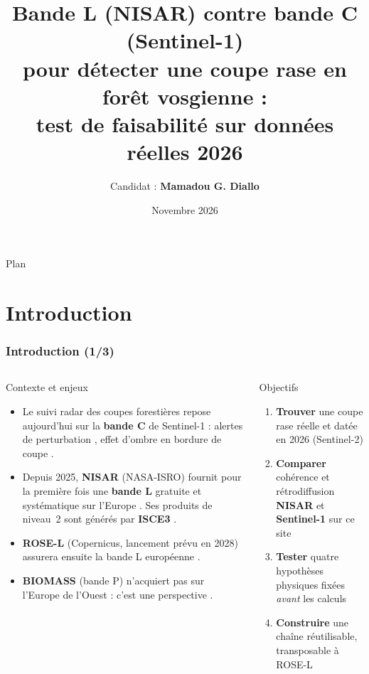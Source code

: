\documentclass[aspectratio=169]{beamer}
\title{\Large
	Bande L (NISAR) contre bande C (Sentinel-1)\\
	pour détecter une coupe rase en forêt vosgienne :\\[4pt]
	{\normalsize test de faisabilité sur données réelles 2026}
}
\author{%
	Candidat : \textbf{Mamadou G. Diallo}
}
\date{Novembre 2026}
\newcommand{\Lb}[1]{\textcolor{Lband}{\textbf{#1}}}
\newcommand{\Cb}[1]{\textcolor{Cband}{\textbf{#1}}}
\begin{document}
\begin{frame}
	\titlepage
\end{frame}

\begin{frame}{Plan}
	\tableofcontents
\end{frame}

\section{Introduction}

\begin{frame}{\phantom{x}}
	\frametitle{Introduction (1/3)}
	\small
	\begin{columns}[T]
		\begin{block}{Contexte et enjeux}
			\footnotesize
			\begin{itemize}
				\setlength{\itemsep}{3pt}
				\item Le suivi radar des coupes forestières repose aujourd'hui sur la \Cb{bande C} de
				Sentinel-1 : alertes de perturbation \parencite{reiche2021radd}, effet d'ombre en bordure de
				coupe \parencite{bouvet2018shadow}.
				\item Depuis 2025, \Lb{NISAR} (NASA-ISRO) fournit pour la première fois une \Lb{bande L}
				gratuite et systématique sur l'Europe \parencite{kellogg2020nisar}. Ses produits de niveau~2 sont
				générés par \textbf{ISCE3} \parencite{isce3}.
				\item \textbf{ROSE-L} (Copernicus, lancement prévu en 2028) assurera ensuite la bande L
				européenne \parencite{esa2020rosel}.
				\item \textbf{BIOMASS} (bande P) n'acquiert pas sur l'Europe de l'Ouest : c'est une perspective
				\parencite{quegan2019biomass}.
			\end{itemize}
		\end{block}

		\vspace{-8pt}
		\begin{block}{Objectifs}
			\footnotesize
			\begin{enumerate}
				\setlength{\itemsep}{4pt}
				\item \textbf{Trouver} une coupe rase réelle et datée en 2026 (Sentinel-2)
				\item \textbf{Comparer} cohérence et rétrodiffusion \Lb{NISAR} et \Cb{Sentinel-1} sur ce site
				\item \textbf{Tester} quatre hypothèses physiques fixées \emph{avant} les calculs
				\item \textbf{Construire} une chaîne réutilisable, transposable à ROSE-L
			\end{enumerate}
		\end{block}
	\end{columns}
\end{frame}
\end{document}
